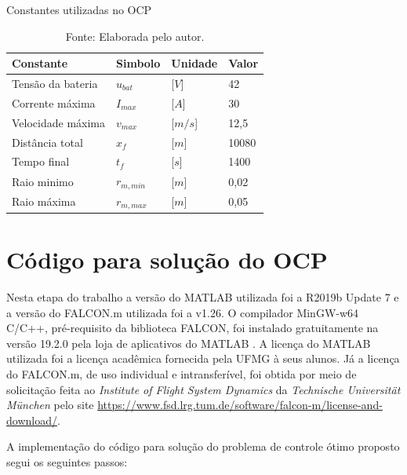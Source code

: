 \begin{table}[H]
	\centering
	\caption{Constantes utilizadas no OCP}
	\begin{tabular}{llll}
		\toprule
		\textbf{Constante} & \textbf{Simbolo} & \textbf{Unidade} & \textbf{Valor}\\
		\hline
		Tensão da bateria   & $u_{bat}$     & [$V$]    & 42    \\
        Corrente máxima     & $I_{max}$     & [$A$]    & 30    \\
        Velocidade máxima   & $v_{max}$     & [$m/s$]  & 12,5  \\  
        Distância total     & $x_f$         & [$m$]    & 10080 \\
        Tempo final         & $t_f$         & [$s$]    & 1400  \\
        Raio minimo         & $r_{m,min}$   & [$m$]    & 0,02  \\
        Raio máxima         & $r_{m,max}$   & [$m$]    & 0,05  \\
		\bottomrule
	\end{tabular}
	\caption*{\footnotesize Fonte: Elaborada pelo autor.}
	\label{tab:constantes_OCP}
\end{table}

\section{Código para solução do OCP}
\label{sec:metodologia_codigos}

Nesta etapa do trabalho a versão do MATLAB  utilizada foi a R2019b Update 7 e a versão do FALCON.m utilizada foi a v1.26.
O compilador MinGW-w64 C/C++, pré-requisito da biblioteca FALCON, foi instalado gratuitamente na versão 19.2.0 pela loja de aplicativos do MATLAB . 
A licença do MATLAB  utilizada foi a licença acadêmica fornecida pela UFMG à seus alunos. Já a licença do FALCON.m, de uso individual e intransferível,
foi obtida por meio de solicitação feita ao \textit{Institute of Flight System Dynamics} da \textit{Technische Universit{\"a}t M{\"u}nchen} pelo site \url{https://www.fsd.lrg.tum.de/software/falcon-m/license-and-download/}.

A implementação do código para solução do problema de controle ótimo proposto segui os seguintes passos:

